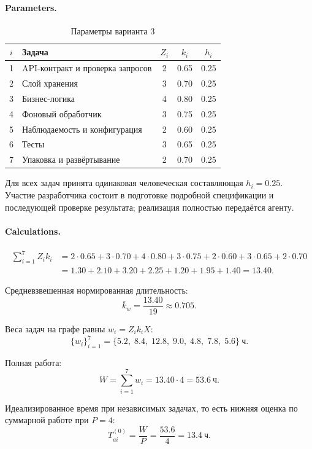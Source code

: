 \documentclass[12pt,a4paper]{article}
\theoremstyle{definition}
\begin{document}
\paragraph{Parameters.}
\begin{table}[ht!]
\centering
\caption{Параметры варианта 3}
\label{tab:practical-v3-params}
\begin{tabular}{clccc}
\toprule
$i$ & Задача & $Z_i$ & $k_i$ & $h_i$ \\
\midrule
1 & API-контракт и проверка запросов & 2 & 0.65 & 0.25 \\
2 & Слой хранения & 3 & 0.70 & 0.25 \\
3 & Бизнес-логика & 4 & 0.80 & 0.25 \\
4 & Фоновый обработчик & 3 & 0.75 & 0.25 \\
5 & Наблюдаемость и конфигурация & 2 & 0.60 & 0.25 \\
6 & Тесты & 3 & 0.65 & 0.25 \\
7 & Упаковка и развёртывание & 2 & 0.70 & 0.25 \\
\bottomrule
\end{tabular}
\end{table}

Для всех задач принята одинаковая человеческая составляющая $h_i = 0.25$. Участие разработчика состоит в подготовке подробной спецификации и последующей проверке результата; реализация полностью передаётся агенту.

\paragraph{Calculations.}
\begin{align*}
  \sum_{i=1}^{7} Z_i k_i &= 2{\cdot}0.65 + 3{\cdot}0.70 + 4{\cdot}0.80 + 3{\cdot}0.75 + 2{\cdot}0.60 + 3{\cdot}0.65 + 2{\cdot}0.70 \\
  &= 1.30 + 2.10 + 3.20 + 2.25 + 1.20 + 1.95 + 1.40 = 13.40.
\end{align*}

Средневзвешенная нормированная длительность:
\[
  \bar{k}_w = \frac{13.40}{19} \approx 0.705.
\]

Веса задач на графе равны $w_i = Z_i k_i X$:
\[
  \{w_i\}_{i=1}^{7} = \{5.2,\; 8.4,\; 12.8,\; 9.0,\; 4.8,\; 7.8,\; 5.6\}~\text{ч}.
\]

Полная работа:
\[
  W = \sum_{i=1}^{7} w_i = 13.40 \cdot 4 = 53.6~\text{ч}.
\]

Идеализированное время при независимых задачах, то есть нижняя оценка по суммарной работе при $P = 4$:
\[
  T_{ai}^{(0)} = \frac{W}{P} = \frac{53.6}{4} = 13.4~\text{ч}.
\]
\end{document}
